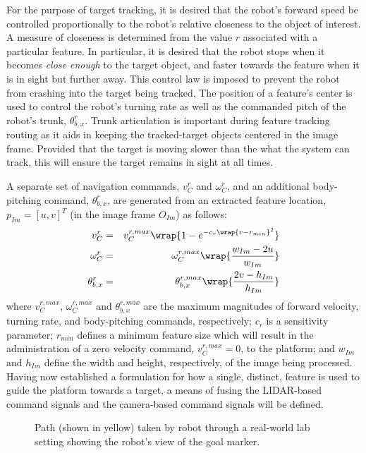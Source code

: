 			For the purpose of target tracking, it is desired that the robot's forward speed be controlled proportionally to the robot's relative closeness to the object of interest. A measure of closeness is determined from the value $r$ associated with a particular feature. In particular, it is desired that the robot stops when it becomes \emph{close enough} to the target object, and faster towards the feature when it is in sight but further away. This control law is imposed to prevent the robot from crashing into the target being tracked. The position of a feature's center is used to control the robot's turning rate as well as the commanded pitch of the robot's trunk, $\theta_{b,x}^{r}$. Trunk articulation is important during feature tracking routing as it aids in keeping the tracked-target objects centered in the image frame. Provided that the target is moving slower than the what the system can track, this will ensure the target remains in sight at all times.

			A separate set of navigation commands, $v_{C}^{r}$ and $\omega_{C}^{r}$, and an additional body-pitching command, $\theta_{b,x}^{r}$,  are generated from an extracted feature location, $p_{Im} = [u,v]^{T}$ (in the image frame $O_{Im}$) as follows: 
				\begin{eqnarray}
					v_{C}^{r} 			& = & v_{C}^{r,max} \wrap{ 1 - e^{ -c_{r} \wrap{ r-r_{min} }^{2} } } 	\nonumber 	\\
					\omega_{C}^{r} 	& = & \omega_{C}^{r,max} \wrap{\frac{ w_{Im} - 2 u  }{ w_{Im} } }		\nonumber 	\\
					\theta_{b,x}^{r}	& = & \theta_{b,x}^{r,max} \wrap{ \frac{ 2 v - h_{Im} }{ h_{Im} } } 		
				\end{eqnarray}
			where $v_{C}^{r,max}$, $\omega_{C}^{r,max}$ and $\theta_{b,x}^{r,max}$ are the maximum magnitudes of forward velocity, turning rate, and body-pitching commands, respectively; $c_{r}$ is a sensitivity parameter; $r_{min}$ defines a minimum feature size which will result in the administration of a zero velocity command, $v_{C}^{r,max}=0$, to the platform; and $w_{Im}$ and $h_{Im}$ define the width and height, respectively, of the image being processed. Having now established a formulation for how a single, distinct, feature is used to guide the platform towards a target, a means of fusing the LIDAR-based command signals and the camera-based command signals will be defined.

				\begin{figure}[!h]
					\centering
					\caption{Path (shown in yellow) taken by robot through a real-world lab setting showing the robot's view of the goal marker.}
					\label{fig::potential_field_results_real}
				\end{figure}

